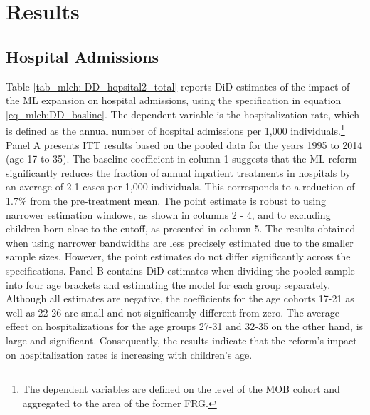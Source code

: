 \section{Results}\label{sec_mlch:results}

\subsection{Hospital Admissions}


Table \ref{tab_mlch: DD_hopsital2_total} reports DiD estimates of the impact of the ML expansion on hospital admissions, using the specification in equation \ref{eq_mlch:DD_basline}. The dependent variable is the hospitalization rate, which is defined as the annual number of hospital admissions per 1,000 individuals.\footnote{The dependent variables are defined on the level of the MOB cohort and aggregated to the area of the former FRG.} Panel A presents ITT results based on the pooled data for the years 1995 to 2014 (age 17 to 35). The baseline coefficient in column 1 suggests that the ML reform significantly reduces the fraction of annual inpatient treatments in hospitals by an average of 2.1 cases per 1,000 individuals. This corresponds to a reduction of 1.7\% from the pre-treatment mean. The point estimate is robust to using narrower estimation windows, as shown in columns 2 - 4, and to excluding children born close to the cutoff, as presented in column 5. The results obtained when using narrower bandwidths are less precisely estimated due to the smaller sample sizes. However, the point estimates do not differ significantly across the specifications. Panel B contains DiD estimates when dividing the pooled sample into four age brackets and estimating the model for each group separately. Although all estimates are negative, the coefficients for the age cohorts 17-21 as well as 22-26 are small and not significantly different from zero. The average effect on hospitalizations for the age groups 27-31 and 32-35 on the other hand, is large and significant. Consequently, the results indicate that the reform's impact on hospitalization rates is increasing with children's age.


